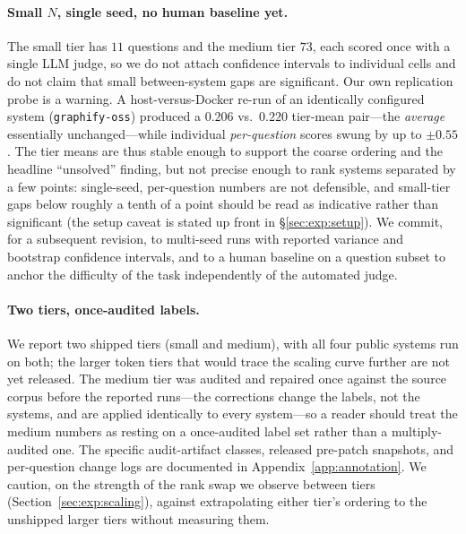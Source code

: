 \paragraph{Small $N$, single seed, no human baseline yet.}
\label{para:small-n-single-seed}
The small tier has $11$ questions and the medium tier $73$, each scored once
with a single LLM judge, so we do not attach confidence intervals to individual
cells and do not claim that small between-system gaps are significant. Our own
replication probe is a warning. A host-versus-Docker re-run of an identically
configured system (\texttt{graphify-oss}) produced a $0.206$ vs.\ $0.220$
tier-mean pair---the \emph{average} essentially unchanged---while individual
\emph{per-question} scores swung by up to $\pm0.55$. The tier means are thus
stable enough to support the coarse ordering and the headline ``unsolved''
finding, but not precise enough to rank systems separated by a few points:
single-seed, per-question numbers are not defensible, and small-tier gaps below
roughly a tenth of a point should be read as indicative rather than significant
(the setup caveat is stated up front in \S\ref{sec:exp:setup}). We commit, for a
subsequent revision, to multi-seed runs with reported variance and bootstrap
confidence intervals, and to a human baseline on a question subset to anchor the
difficulty of the task independently of the automated judge.

\paragraph{Two tiers, once-audited labels.}
\label{para:two-tiers-manual-corrections}
We report two shipped tiers (small and medium), with all four public systems run
on both; the larger token tiers that would trace the scaling curve further are
not yet released. The medium tier was audited and repaired once against the
source corpus before the reported runs---the corrections change the labels, not
the systems, and are applied identically to every system---so a reader should
treat the medium numbers as resting on a once-audited label set rather than a
multiply-audited one. The specific audit-artifact classes, released pre-patch
snapshots, and per-question change logs are documented in
Appendix~\ref{app:annotation}. We caution, on the strength of the rank swap we
observe between tiers (Section~\ref{sec:exp:scaling}), against extrapolating
either tier's ordering to the unshipped larger tiers without measuring them.

